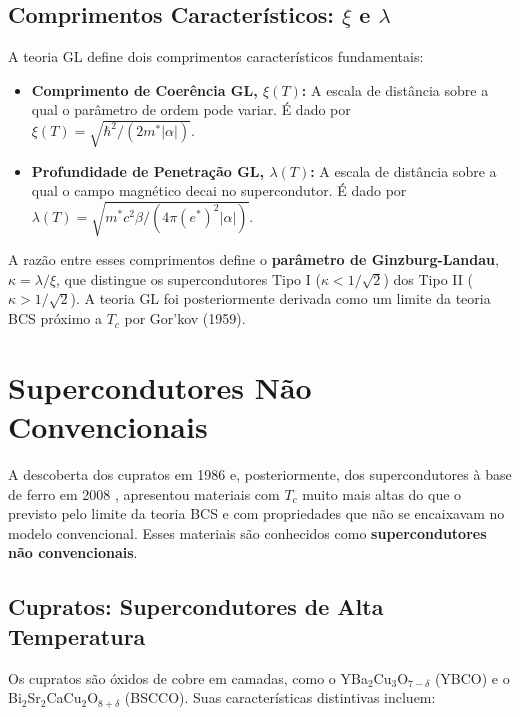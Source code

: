 \documentclass[12pt, a4paper, oneside]{report}
\begin{document}
\subsection{Comprimentos Característicos: $\xi$ e $\lambda$}

A teoria GL define dois comprimentos característicos fundamentais:

\begin{itemize}
    \item \textbf{Comprimento de Coerência GL, $\xi(T)$:} A escala de distância sobre a qual o parâmetro de ordem pode variar. É dado por $\xi(T) = \sqrt{\hbar^2 / (2m^* |\alpha|)}$.
    \item \textbf{Profundidade de Penetração GL, $\lambda(T)$:} A escala de distância sobre a qual o campo magnético decai no supercondutor. É dado por $\lambda(T) = \sqrt{m^* c^2 \beta / (4\pi (e^*)^2 |\alpha|)}$.
\end{itemize}

A razão entre esses comprimentos define o \textbf{parâmetro de Ginzburg-Landau}, $\kappa = \lambda / \xi$, que distingue os supercondutores Tipo I ($\kappa < 1/\sqrt{2}$) dos Tipo II ($\kappa > 1/\sqrt{2}$). A teoria GL foi posteriormente derivada como um limite da teoria BCS próximo a $T_c$ por Gor'kov (1959).

\section{Supercondutores Não Convencionais}

A descoberta dos cupratos em 1986 \cite{bednorz1986} e, posteriormente, dos supercondutores à base de ferro em 2008 \cite{kamihara2008}, apresentou materiais com $T_c$ muito mais altas do que o previsto pelo limite da teoria BCS e com propriedades que não se encaixavam no modelo convencional. Esses materiais são conhecidos como \textbf{supercondutores não convencionais}.

\subsection{Cupratos: Supercondutores de Alta Temperatura}

Os cupratos são óxidos de cobre em camadas, como o YBa$_2$Cu$_3$O$_{7-\delta}$ (YBCO) e o Bi$_2$Sr$_2$CaCu$_2$O$_{8+\delta}$ (BSCCO). Suas características distintivas incluem:
\end{document}
